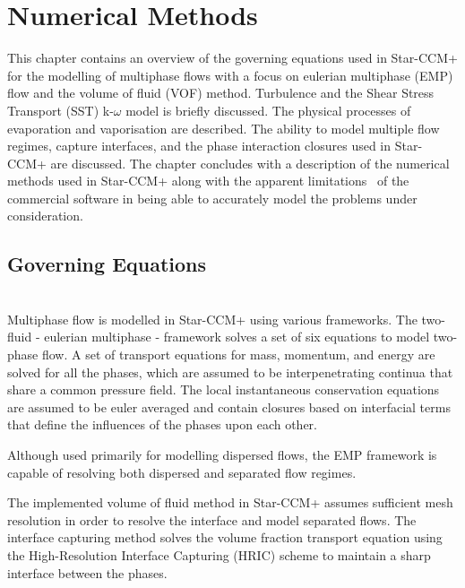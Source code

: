 \section{Numerical Methods}
This chapter contains an overview of the governing equations used in Star-CCM+ for the modelling of multiphase flows with a focus on
eulerian multiphase (EMP) flow and the volume of fluid (VOF) method. Turbulence and the Shear Stress Transport (SST) k-$\omega$ model is
briefly discussed. The physical processes of evaporation and vaporisation are described.
The ability to model multiple flow regimes, capture interfaces, and the phase interaction closures used in Star-CCM+ are discussed.
The chapter concludes with a description of the numerical methods used in Star-CCM+ along with the apparent limitations~
of the commercial software in being able to accurately model the problems under consideration.

\subsection{Governing Equations}
\hfill\\
Multiphase flow is modelled in Star-CCM+ using various frameworks. The two-fluid - eulerian multiphase - framework solves a set of six equations
to model two-phase flow. A set of transport equations for mass, momentum, and energy are solved for all the phases, which are assumed to
be interpenetrating continua that share a common pressure field. The local instantaneous conservation equations are assumed to be euler averaged and
contain closures based on interfacial terms that define the influences of the phases upon each other.

Although used primarily for modelling dispersed flows, the EMP framework is capable
of resolving both dispersed and separated flow regimes.

The implemented volume of fluid method in Star-CCM+ assumes sufficient mesh resolution
in order to resolve the interface and model separated flows. The interface capturing method solves
the volume fraction transport equation using the High-Resolution Interface Capturing (HRIC) scheme
to maintain a sharp interface between the phases.

